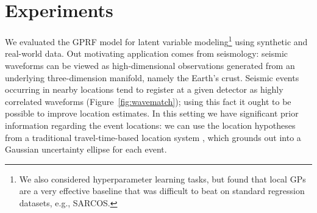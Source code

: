 \documentclass{article}
\renewcommand{\v}[1]{\mathbf{#1}}
\begin{document}


\section{Experiments}

We evaluated the GPRF model for latent variable modeling\footnote{We also considered
  hyperparameter learning tasks, but found that local GPs are a very effective
  baseline that was difficult to beat on standard
  regression datasets, e.g., SARCOS.} using
synthetic and real-world data. Out motivating application comes from seismology: seismic waveforms can be viewed as
high-dimensional observations generated from an underlying
three-dimension manifold, namely the Earth's crust. Seismic events
occurring in nearby locations tend to register at a given detector as highly correlated
waveforms (Figure~\ref{fig:wavematch}); using this fact it ought to be
possible to improve location estimates. In this setting we have significant prior
information regarding the event locations: we can use the
location hypotheses from a traditional travel-time-based location system
\cite{ISCcitation2015}, which grounds out into a
Gaussian uncertainty ellipse for each event. 
\end{document}
